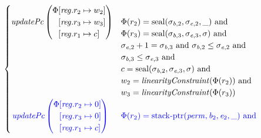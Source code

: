 \documentclass[a3paper]{article}
\newcommand{\tand}{\text{ and }}
\newcommand{\sourcecolor}{\color{blue}}
\newcommand{\update}[2]{[#1 \mapsto #2]}
\newcommand{\updReg}[2]{\update{\reg.#1}{#2}}
\newcommand{\shareddom}[1]{\mathrm{#1}}
\newcommand{\perm}{\var{perm}}
\newcommand{\stkptr}[1]{\mathrm{stack\text{-}ptr}(#1)}
\newcommand{\seal}[1]{\shareddom{seal}(#1)}
\newcommand{\var}[1]{\mathit{#1}}
\newcommand{\reg}{\var{reg}}
\newcommand{\baddr}{\var{b}}
\newcommand{\eaddr}{\var{e}}
\newcommand{\plainfun}[2]{
  \ifthenelse{\equal{#2}{}}
  {\mathit{#1}}
  {\mathit{#1}(#2)}
}
\newcommand{\linCons}[1]{\plainfun{linearityConstraint}{#1}}
\newcommand{\updPcAddr}[1]{\plainfun{updatePc}{#1}}
\begin{document}
\begin{align*}
\begin{cases}
                                \updPcAddr{}\left(
                                \arraycolsep=0pt
                                \begin{array}{r l}
                                  \Phi&\updReg{r_2}{w_2}\\
                                      &\updReg{r_3}{w_3}\\
                                      &\updReg{r_1}{c}
                                \end{array}\right)
&
                                \arraycolsep=0pt
                                \begin{array}[t]{l}
                                  \Phi(r_2) = \seal{\sigma_{\baddr,2},\sigma_{\eaddr,2},\_} \tand \\
                                  \Phi(r_3) = \seal{\sigma_{\baddr,3},\sigma_{\eaddr,3},\sigma} \tand \\
                                  \sigma_{\eaddr,2}+1 = \sigma_{\baddr,3} \tand \sigma_{\baddr,2} \leq \sigma_{\eaddr,2} \tand\\
                                  \sigma_{\baddr,3} \leq \sigma_{\eaddr,3} \tand \\
                                  c = \seal{\sigma_{\baddr,2},\sigma_{\eaddr,3},\sigma} \tand \\
                                  w_2 = \linCons{\Phi(r_2)} \tand \\
                                  w_3 = \linCons{\Phi(r_3)} \\
                                \end{array}\\
                                \sourcecolor\left.
                                \updPcAddr{}\left(
                                \arraycolsep=0pt
                                \begin{array}{r l}
                                  \Phi&\updReg{r_2}{0}\\
                                      &\updReg{r_3}{0}\\
                                      &\updReg{r_1}{c}
                                \end{array}\right)\right.
&
                                \sourcecolor
                                \arraycolsep=0pt
                                \begin{array}[t]{l}
                                  \Phi(r_2) = \stkptr{\perm,\baddr_2,\eaddr_2,\_} \tand \\

\end{array}
\end{cases}
\end{align*}
\end{document}
